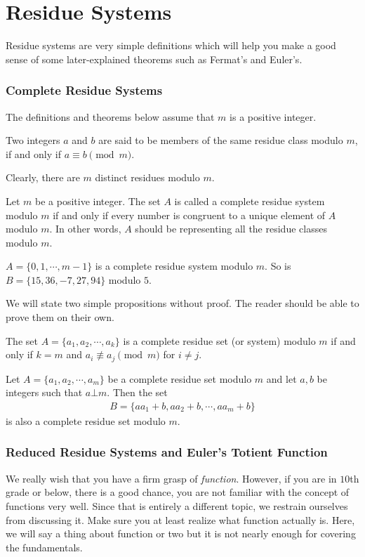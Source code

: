 \section{Residue Systems}
Residue systems are very simple definitions which will help you make a good sense of some later-explained theorems such as Fermat's and Euler's.
\subsubsection{Complete Residue Systems}
The definitions and theorems below assume that $m$ is a positive integer.
	\begin{definition}
		Two integers $a$ and $b$ are said to be members of the same {residue class} modulo $m$, if and only if $a \equiv b \pmod m$.
	\end{definition}
Clearly, there are $m$ distinct residues modulo $m$.
	\begin{definition}\label{def:completeresiduesystem}
		Let $m$ be a positive integer. The set $A$ is called a {complete residue system modulo $m$} if and only if every number is congruent to a unique element of $A$ modulo $m$. In other words, $A$ should be representing all the residue classes modulo $m$.
	\end{definition}

	\begin{example}
		$A = \{0,1, \cdots, m-1\}$ is a complete residue system modulo $m$. So is $B=\{15, 36, -7, 27, 94\}$ modulo $5$.
	\end{example}
We will state two simple propositions without proof. The reader should be able to prove them on their own.

\begin{proposition}
	The set $A=\{a_1, a_2, \cdots, a_k\}$ is a complete residue set (or system) modulo $m$ if and only if $k=m$ and $a_i \not\equiv a_j \pmod m$ for $i \neq j$.
\end{proposition}

\begin{proposition} \label{prop:generalcompletesystem}
	Let $A=\{a_1, a_2, \cdots, a_m\}$ be a complete residue set modulo $m$ and let $a,b$ be integers such that $a \bot m$. Then the set
	\begin{align*}
		B=\{aa_1+b, aa_2+b, \cdots, aa_m+b\}
	\end{align*}
	is also a complete residue set modulo $m$.
\end{proposition}

\subsubsection{Reduced Residue Systems and Euler's Totient Function}
We really wish that you have a firm grasp of \textit{function}. However, if you are in $10$th grade or below, there is a good chance, you are not familiar with the concept of functions very well. Since that is entirely a different topic, we restrain ourselves from discussing it. Make sure you at least realize what function actually is. Here, we will say a thing about function or two but it is not nearly enough for covering the fundamentals.


